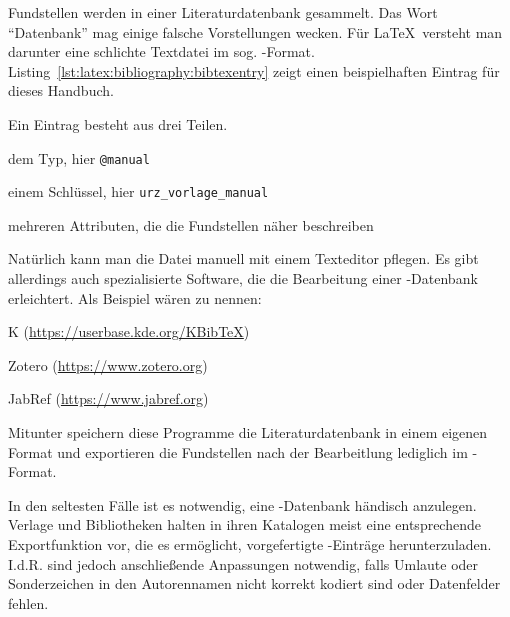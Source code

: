 Fundstellen werden in einer Literaturdatenbank gesammelt. Das Wort
"`Datenbank"' mag einige falsche Vorstellungen wecken. Für \LaTeX\ versteht man
darunter eine schlichte Textdatei im sog. -Format.
Listing~\ref{lst:latex:bibliography:bibtexentry} zeigt einen beispielhaften
Eintrag für dieses Handbuch.



Ein Eintrag besteht aus drei Teilen.
%
\begin{compactenum}
\item dem Typ, hier \texttt{@manual}
\item einem Schlüssel, hier \texttt{urz\_vorlage\_manual}
\item mehreren Attributen, die die Fundstellen näher beschreiben
\end{compactenum}

Natürlich kann man die Datei manuell mit einem Texteditor pflegen. Es gibt
allerdings auch spezialisierte Software, die die Bearbeitung einer
-Datenbank erleichtert. Als Beispiel wären zu nennen:
%
\begin{compactitem}
\item K (\url{https://userbase.kde.org/KBibTeX})
\item Zotero (\url{https://www.zotero.org})
\item JabRef (\url{https://www.jabref.org})
\end{compactitem}
%
Mitunter speichern diese Programme die Literaturdatenbank in einem eigenen
Format und exportieren die Fundstellen nach der Bearbeitlung lediglich im
-Format.

In den seltesten Fälle ist es notwendig, eine -Datenbank
händisch anzulegen. Verlage und Bibliotheken halten in ihren Katalogen meist
eine entsprechende Exportfunktion vor, die es ermöglicht, vorgefertigte
-Einträge herunterzuladen. I.d.R. sind jedoch anschließende
Anpassungen notwendig, falls Umlaute oder Sonderzeichen in den Autorennamen
nicht korrekt kodiert sind oder Datenfelder fehlen.

